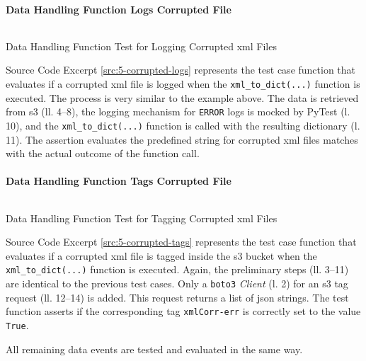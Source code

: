 \paragraph{Data Handling Function Logs Corrupted File}
\begin{listing}[h!]
	\inputminted{python}{main-matter/src/5-corrupted-logs.py}
	\caption{Data Handling Function Test for Logging Corrupted \acs{xml} Files}
	\label{src:5-corrupted-logs}
\end{listing}
Source Code Excerpt \ref{src:5-corrupted-logs} represents the test case function that evaluates if a corrupted \ac{xml} file is logged when the \texttt{xml\_to\_dict(...)} function is executed. The process is very similar to the example above. The data is retrieved from \ac{s3} (ll. 4--8), the logging mechanism for \texttt{ERROR} logs is mocked by PyTest (l. 10), and the \texttt{xml\_to\_dict(...)} function is called with the resulting dictionary (l. 11). The assertion evaluates the predefined string for corrupted \ac{xml} files matches with the actual outcome of the function call.

\paragraph{Data Handling Function Tags Corrupted File}
\begin{listing}[h!]
	\inputminted{python}{main-matter/src/5-corrupted-tags.py}
	\caption{Data Handling Function Test for Tagging Corrupted \acs{xml} Files}
	\label{src:5-corrupted-tags}
\end{listing}
Source Code Excerpt \ref{src:5-corrupted-tags} represents the test case function that evaluates if a corrupted \ac{xml} file is tagged inside the \ac{s3} bucket when the \texttt{xml\_to\_dict(...)} function is executed. Again, the preliminary steps (ll. 3--11) are identical to the previous test cases. Only a \texttt{boto3} \textit{Client} (l. 2) for an \ac{s3} tag request (ll. 12--14) is added. This request returns a list of \ac{json} strings. The test function asserts if the corresponding tag \texttt{xmlCorr-err} is correctly set to the value \texttt{True}.

All remaining data events are tested and evaluated in the same way.

